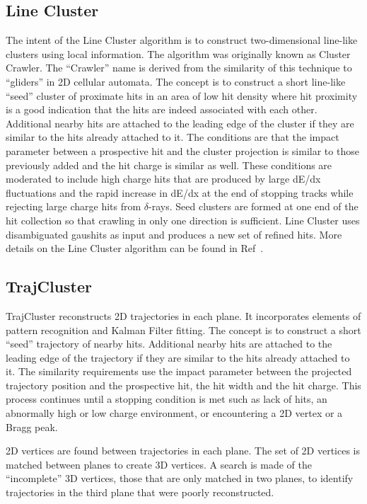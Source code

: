 \subsection{Line Cluster}\label{sec:LineCluster}
The intent of the Line Cluster algorithm is to construct two-dimensional line-like clusters using local information. The algorithm was originally known as Cluster Crawler. The ``Crawler'' name is derived from the similarity of this technique to ``gliders'' in 2D cellular automata. The concept is to construct a short line-like ``seed'' cluster of proximate hits in an area of low hit density where hit proximity is a good indication that the hits are indeed associated with each other. Additional nearby hits are attached to the leading edge of the cluster if they are similar to the hits already attached to it. The conditions are that the impact parameter between a prospective hit and the cluster projection is similar to those previously added and the hit charge is similar as well. These conditions are moderated to include high charge hits that are produced by large dE/dx fluctuations and the rapid increase in dE/dx at the end of stopping tracks while rejecting large charge hits from $\delta$-rays.
Seed clusters are formed at one end of the hit collection so that crawling in only one direction is sufficient. Line Cluster uses disambiguated gaushits as input and produces a new set of refined hits. More details on the Line Cluster algorithm can be found in Ref~\cite{ref:linecluster}.

\subsection{TrajCluster}\label{sec:TrajCluster}
TrajCluster reconstructs 2D trajectories in each plane. It incorporates elements of pattern recognition and Kalman Filter fitting. The concept is to construct a short ``seed'' trajectory of nearby hits. Additional nearby hits are attached to the leading edge of the trajectory if they are similar to the hits already attached to it. The similarity requirements use the impact parameter between the projected trajectory position and the prospective hit, the hit width and the hit charge. This process continues until a stopping condition is met such as lack of hits, an abnormally high or low charge environment, or encountering a 2D vertex or a Bragg peak.

2D vertices are found between trajectories in each plane. The set of 2D vertices is matched between planes to create 3D vertices. A search is made of the ``incomplete'' 3D vertices, those that are only matched in two planes, to identify trajectories in the third plane that were poorly reconstructed.

